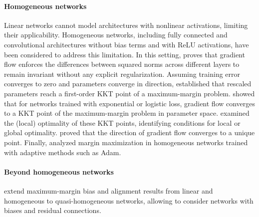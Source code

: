 \paragraph{Homogeneous networks} Linear networks cannot model architectures with nonlinear activations, limiting their applicability. Homogeneous networks, including fully connected and convolutional architectures without bias terms and with ReLU activations, have been considered to address this limitation.  
In this setting, \cite{du2018algorithmic} proves that gradient flow enforces the differences between squared norms across different layers to remain invariant without any explicit regularization.
Assuming training error converges to zero and parameters converge in direction, \cite{nacson2019lexicographic} established that rescaled parameters reach a first-order KKT point of a maximum-margin problem.  
\cite{Lyu_Li_maxmargin} showed that for networks trained with exponential or logistic loss, gradient flow converges to a KKT point of the maximum-margin problem in parameter space. \cite{vardi2022margin} examined the (local) optimality of these KKT points, identifying conditions for local or global optimality. \cite{ji2020directional} proved that the direction of gradient flow converges to a unique point. Finally, \cite{wang2021implicit} analyzed margin maximization in homogeneous networks trained with adaptive methods such as Adam.

\paragraph{Beyond homogeneous networks}
\cite{kunin2022asymmetric, le2022training} extend maximum-margin bias and alignment results from linear and homogeneous to quasi-homogeneous networks, allowing to consider networks with biases and residual connections.
